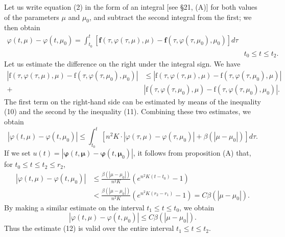 \documentclass[10pt,a5paper]{book}
\makeatletter
\theoremstyle{plain}
\theoremstyle{definition}
\theoremstyle{remark}
\renewenvironment{proof}[1][\proofname]{\par
  \pushQED{\qed}%
  \normalfont\topsep6\p@\@plus6\p@\relax
  \trivlist
  \item\relax{\itshape #1\@addpunct{.}}\hspace\labelsep\ignorespaces
}{\popQED\endtrivlist\@endpefalse}
\makeatother
\begin{document}
\begin{proof}
Let us write equation (2) in the form of an integral [see §21, (A)] for both values of the parameters $\mu$ and $\mu_{0}$, and subtract the second integral from the first; we then obtain
\[
\begin{aligned}
\varphi(t, \mu)-\varphi\left(t, \mu_{0}\right)=\int_{t_{0}}^{t}\left[\mathbf{f}(\tau, \varphi(\tau, \mu), \mu)-\mathbf{f}\left(\tau, \varphi\left(\tau, \mu_{0}\right), \mu_{0}\right)\right] d \tau & \\
& t_{0} \leq t \leq t_{2} .
\end{aligned}
\]
Let us estimate the difference on the right under the integral sign. We have
\[
\begin{aligned}
\left|\mathrm{f}(\tau, \varphi(\tau, \mu), \mu)-\mathrm{f}\left(\tau, \varphi\left(\tau, \mu_{0}\right), \mu_{0}\right)\right| & \leq\left|\mathrm{f}(\tau, \varphi(\tau, \mu), \mu)-\mathrm{f}\left(\tau, \varphi\left(\tau, \mu_{0}\right), \mu\right)\right| \\
+ & \left|\mathrm{f}\left(\tau, \varphi\left(\tau, \mu_{0}\right), \mu\right)-\mathrm{f}\left(\tau, \varphi\left(\tau, \mu_{0}\right), \mu_{0}\right)\right| .
\end{aligned}
\]
The first term on the right-hand side can be estimated by means of the inequality (10) and the second by the inequality (11). Combining these two estimates, we obtain
\[
\left|\varphi(t, \mu)-\varphi\left(t, \mu_{0}\right)\right| \leq \int_{t_{0}}^{t}\left[n^{2} K \cdot\left|\varphi(\tau, \mu)-\varphi\left(\tau, \mu_{0}\right)\right|+\beta\left(\left|\mu-\mu_{0}\right|\right)\right] d \tau .
\]
If we set $u(t)=\left|\boldsymbol{\varphi}(t, \boldsymbol{\mu})-\boldsymbol{\varphi}\left(t, \boldsymbol{\mu}_{0}\right)\right|$, it follows from proposition (A) that, for $t_{0} \leq t \leq t_{2} \leq r_{2}$,
\[
\begin{aligned}
\left|\varphi(t, \mu)-\varphi\left(t, \mu_{0}\right)\right| & \leq \frac{\beta\left(\left|\mu-\mu_{0}\right|\right)}{n^{2} K}\left(e^{n^{2} K\left(t-t_{0}\right)}-1\right) \\
& <\frac{\beta\left(\left|\mu-\mu_{0}\right|\right)}{n^{2} K}\left(e^{n^{2} K\left(r_{2}-r_{1}\right)}-1\right)=C \beta\left(\left|\mu-\mu_{0}\right|\right) .
\end{aligned}
\]
By making a similar estimate on the interval $t_{1} \leq t \leq t_{0}$, we obtain
\begin{equation*}
\left|\varphi(t, \mu)-\varphi\left(t, \mu_{0}\right)\right| \leq C \beta\left(\left|\mu-\mu_{0}\right|\right) . \tag{12}
\end{equation*}
Thus the estimate (12) is valid over the entire interval $t_{1} \leq t \leq t_{2}$.


\end{proof}
\end{document}
